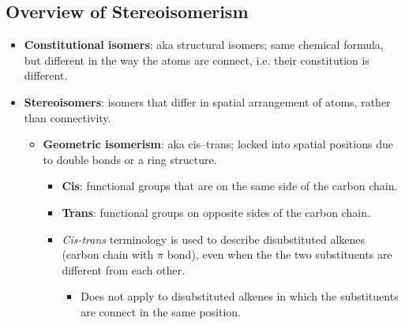 \documentclass[12pt,a4paper]{article}
\begin{document}
\subsection{Overview of Stereoisomerism}
\begin{itemize}
    \item \textbf{Constitutional isomers}: aka structural isomers; same {\color{o-Sun}chemical formula}, but different in the way the {\color{o-Sun}atoms are connect}, i.e. their constitution is different.
    \item \textbf{Stereoisomers}: isomers that differ in {\color{o-Sun}spatial arrangement} of atoms, rather than connectivity.
        \begin{itemize}
            \item \textbf{Geometric isomerism}: aka cis--trans; {\color{o-Sun}locked into spatial positions} due to double bonds or a ring structure.
                \begin{itemize}
                    \item \textbf{Cis}: functional groups that are on the {\color{o-Sun} same side} of the carbon chain.
                    \item \textbf{Trans}: functional groups on {\color{o-Sun}opposite sides} of the carbon chain.
                    \item \textit{Cis-trans} terminology is used to describe disubstituted alkenes (carbon chain with $\pi$ bond), even when the the two substituents are different from each other.
                        \begin{itemize}
                            \item Does not apply to disubstituted alkenes in which the substituents are connect in the same position.
                        \end{itemize}
                \end{itemize}
        \end{itemize}

\end{itemize}
\end{document}
